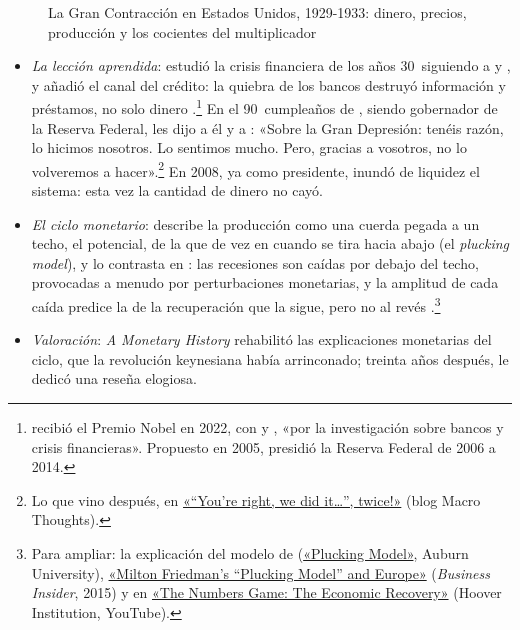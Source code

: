 \documentclass[11pt]{article}
\begin{document}
\begin{figure}[H]
\centering
\caption{La Gran Contracción en Estados Unidos, 1929-1933: dinero, precios, producción y los cocientes del multiplicador}\label{fig:gran-contraccion}
\end{figure}

\begin{itemize}
\item \emph{La lección aprendida}:  estudió la crisis financiera de los años 30~siguiendo a  y , y añadió el canal del crédito: la quiebra de los bancos destruyó información y préstamos, no solo dinero\nocite{Bernanke1983Nonmonetary} .\footnote{ recibió el Premio Nobel en 2022, con  y , «por la investigación sobre bancos y crisis financieras»\nocite{Nobel2022}. Propuesto en 2005, presidió la Reserva Federal de 2006 a 2014.} En el 90~cumpleaños de , siendo gobernador de la Reserva Federal, les dijo a él y a : «Sobre la Gran Depresión: tenéis razón, lo hicimos nosotros. Lo sentimos mucho. Pero, gracias a vosotros, no lo volveremos a hacer»\nocite{Bernanke2002Friedman}.\footnote{Lo que vino después, en \href{https://macrothoughts.weebly.com/blog/youre-right-we-did-it-twice}{«“You're right, we did it…”, twice!»} (blog Macro Thoughts).} En 2008, ya como presidente, inundó de liquidez el sistema: esta vez la cantidad de dinero no cayó.
\item \emph{El ciclo monetario}: \textcite{Friedman1964Monetary} describe la producción como una cuerda pegada a un techo, el potencial, de la que de vez en cuando se tira hacia abajo (el \emph{plucking model}), y lo contrasta en \textcite{Friedman1993Plucking}: las recesiones son caídas por debajo del techo, provocadas a menudo por perturbaciones monetarias, y la amplitud de cada caída predice la de la recuperación que la sigue, pero no al revés .\footnote{Para ampliar: la explicación del modelo de  (\href{https://webhome.auburn.edu/~garriro/fm1pluck.htm}{«Plucking Model»}, Auburn University), \href{https://www.businessinsider.com/milton-friedmans-plucking-model-and-europe-2015-2}{«Milton Friedman's “Plucking Model” and Europe»} (\emph{Business Insider}, 2015) y  en \href{https://youtu.be/1eCYq2vD5GY?t=490}{«The Numbers Game: The Economic Recovery»} (Hoover Institution, YouTube).}
\item \emph{Valoración}: \emph{A Monetary History} rehabilitó las explicaciones monetarias del ciclo, que la revolución keynesiana había arrinconado; treinta años después, \textcite{Lucas1994Review} le dedicó una reseña elogiosa.
\end{itemize}
\end{document}
